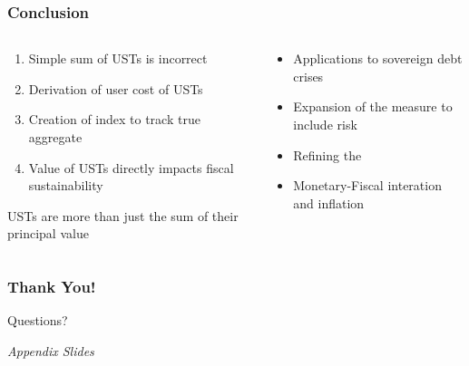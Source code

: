 \documentclass[11pt, handout, aspectratio=169]{beamer}
\newenvironment{wideitemize}{\itemize\addtolength{\itemsep}{10pt}}{\enditemize}
\begin{document}
\begin{frame}
\frametitle{Conclusion}
\begin{columns}[t]
	\begin{column}{.45\textwidth}
		\begin{wideitemize}
			\item {\bf \color{WeberPurple}{Contributions}}
			\begin{enumerate}
				\item Simple sum of USTs is incorrect
				\item Derivation of user cost of USTs
				\item Creation of index to track true aggregate
				\item Value of USTs directly impacts fiscal sustainability
			\end{enumerate}
			\item USTs are more than just the sum of their principal value
		\end{wideitemize}
	\end{column}
	\begin{column}{.55\textwidth}
		\begin{wideitemize}
			\item {\bf \color{WeberPurple}{Extensions}}
			\begin{itemize}
				\item Applications to sovereign debt crises
				\item Expansion of the measure to include risk
				\item Refining the 
				\item Monetary-Fiscal interation and inflation
			\end{itemize}
		\end{wideitemize}
	\end{column}
\end{columns}
\end{frame}

\begin{frame}
	\frametitle{Thank You!}
	\begin{center}
		\LARGE \textcolor{WeberPurple}{Questions?}
	\end{center}
\end{frame}

\appendix
\setcounter{framenumber}{0}

\begin{frame}
	\begin{center}
		\LARGE \textcolor{WeberPurple}{\it Appendix Slides}
	\end{center}
\end{frame}
	
\end{document}
